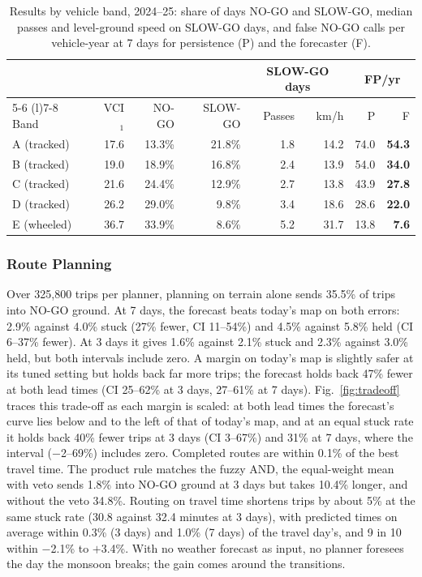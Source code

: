 \documentclass[conference]{IEEEtran}
\begin{document}
\begin{table}[t]
  \caption{Results by vehicle band, 2024--25: share of days NO-GO and SLOW-GO, median passes and level-ground speed on SLOW-GO days, and false NO-GO calls per vehicle-year at 7 days for persistence (P) and the forecaster (F).}
  \label{tab:slowgo}
  \centering
  \footnotesize
  \setlength{\tabcolsep}{2.2pt}
  \begin{tabular}{@{}lrrrrrrr@{}}
    \toprule
    & & & & \multicolumn{2}{c}{SLOW-GO days} & \multicolumn{2}{c}{FP/yr} \\
    \cmidrule(lr){5-6} \cmidrule(l){7-8}
    Band & VCI$_1$ & NO-GO & SLOW-GO & Passes & km/h & P & F \\
    \midrule
    A (tracked) & 17.6 & 13.3\% & 21.8\% & 1.8 & 14.2 & 74.0 & \textbf{54.3} \\
    B (tracked) & 19.0 & 18.9\% & 16.8\% & 2.4 & 13.9 & 54.0 & \textbf{34.0} \\
    C (tracked) & 21.6 & 24.4\% & 12.9\% & 2.7 & 13.8 & 43.9 & \textbf{27.8} \\
    D (tracked) & 26.2 & 29.0\% &  9.8\% & 3.4 & 18.6 & 28.6 & \textbf{22.0} \\
    E (wheeled) & 36.7 & 33.9\% &  8.6\% & 5.2 & 31.7 & 13.8 & \textbf{7.6} \\
    \bottomrule
  \end{tabular}
\end{table}

\subsubsection{Route Planning}
Over 325,800 trips per planner, planning on terrain alone sends 35.5\% of trips into NO-GO ground. At 7 days, the
forecast beats today's map on both errors: 2.9\% against 4.0\% stuck (27\% fewer, CI 11--54\%)
and 4.5\% against 5.8\% held (CI 6--37\% fewer). At 3 days it gives 1.6\% against 2.1\% stuck and
2.3\% against 3.0\% held, but both intervals include zero. A margin on today's map is slightly
safer at its tuned setting but holds back far more trips; the forecast holds back 47\% fewer at
both lead times (CI 25--62\% at 3 days, 27--61\% at 7 days). Fig.~\ref{fig:tradeoff} traces this trade-off as each margin is scaled: at both lead times the
forecast's curve lies below and to the left of that of today's map, and at an equal stuck rate it holds
back 40\% fewer trips at 3 days (CI 3--67\%) and 31\% at 7 days, where the interval ($-$2--69\%)
includes zero. Completed routes are within 0.1\% of the best travel time. The product rule
matches the fuzzy AND, the equal-weight mean with veto sends 1.8\% into NO-GO ground at 3 days but takes
10.4\% longer, and without the veto 34.8\%. Routing on travel time shortens trips by about 5\% at
the same stuck rate (30.8 against 32.4 minutes at 3 days), with predicted times on average within
0.3\% (3 days) and 1.0\% (7 days) of the travel day's, and 9 in 10 within $-$2.1\% to $+$3.4\%.
With no weather forecast as input, no planner foresees the day the monsoon breaks; the gain comes
around the transitions.
\end{document}
